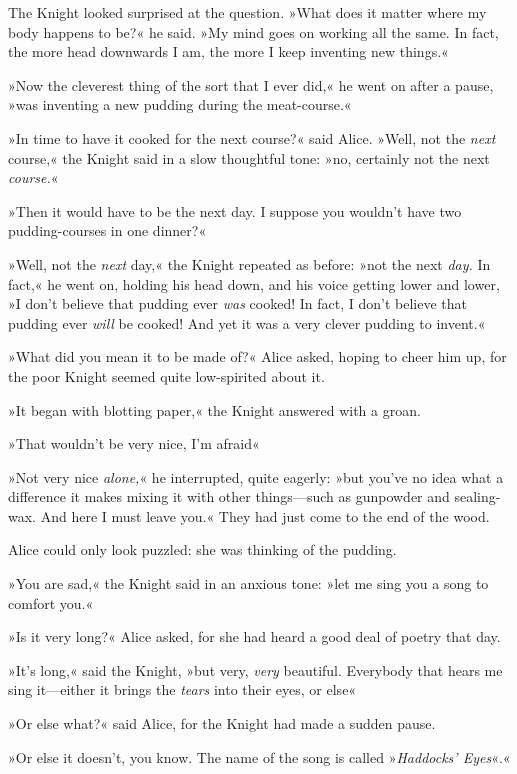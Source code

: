 The Knight looked surprised at the question. »What does it matter where my body happens to be?« he said. »My mind goes on working all the same. In fact, the more head downwards I am, the more I keep inventing new things.«

»Now the cleverest thing of the sort that I ever did,« he went on after a pause, »was inventing a new pudding during the meat-course.«

»In time to have it cooked for the next course?« said Alice. »Well, not the \textit{next} course,« the Knight said in a slow thoughtful tone: »no, certainly not the next \textit{course.}«

»Then it would have to be the next day. I suppose you wouldn't have two pudding-courses in one dinner?«

»Well, not the \textit{next} day,« the Knight repeated as before: »not the next \textit{day.} In fact,« he went on, holding his head down, and his voice getting lower and lower, »I don't believe that pudding ever \textit{was} cooked! In fact, I don't believe that pudding ever \textit{will} be cooked! And yet it was a very clever pudding to invent.«

»What did you mean it to be made of?« Alice asked, hoping to cheer him up, for the poor Knight seemed quite low-spirited about it.

»It began with blotting paper,« the Knight answered with a groan.

»That wouldn't be very nice, I'm afraid\longdash«

»Not very nice \textit{alone,}« he interrupted, quite eagerly: »but you've no idea what a difference it makes mixing it with other things—such as gunpowder and sealing-wax. And here I must leave you.« They had just come to the end of the wood.

Alice could only look puzzled: she was thinking of the pudding.

»You are sad,« the Knight said in an anxious tone: »let me sing you a song to comfort you.«

»Is it very long?« Alice asked, for she had heard a good deal of poetry that day.

»It's long,« said the Knight, »but very, \textit{very} beautiful. Everybody that hears me sing it—either it brings the \textit{tears} into their eyes, or else\longdash«

»Or else what?« said Alice, for the Knight had made a sudden pause.

»Or else it doesn't, you know. The name of the song is called »\textit{Haddocks' Eyes}«.«

